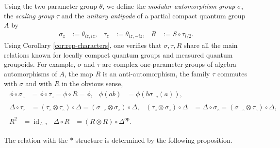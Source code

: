 \documentclass[11pt]{article}
\DeclareMathOperator{\id}{id}
\DeclareMathOperator{\op}{\mathrm{op}}
\theoremstyle{definition}
\numberwithin{equation}{section}
\begin{document}
Using the two-parameter group $\theta$, we define the \emph{modular
  automorphism group} $\sigma$, the \emph{scaling group} $\tau$   and
the \emph{unitary antipode} of a partial compact quantum group $A$ by
\begin{align} \label{eq:rep-groups}
  \sigma_{z} &:=\theta_{iz,iz}, & \tau_{z} &:=\theta_{iz,-iz}, & R&:=S
  \circ \tau_{i/2}.
\end{align}
Using Corollary \ref{cor:rep-characters}, one verifies that
$\sigma,\tau,R$ share all the main relations known for locally compact
quantum groups and measured quantum groupoids. For example, $\sigma$
and $\tau$ are complex one-parameter groups of algebra automorphisms
of $A$, the map $R$ is an anti-automorphism, the family  $\tau$ commutes with
$\sigma$ and with $R$ in the obvious sense, 
  \begin{gather}
    \begin{aligned} \label{eq:modular}
      \phi\circ \sigma_{z} &= \phi \circ \tau_{z} = \phi \circ R =
      \phi, & \phi(ab) &= \phi(b\sigma_{-i}(a)),
    \end{aligned}
\\ \label{eq:scaling-modular-delta}
    \begin{aligned} 
    \Delta \circ \tau_{z} &= (\tau_{z} \otimes \tau_{z}) \circ \Delta = (\sigma_{-z}\otimes \sigma_{z})\circ\Delta,
    & (\tau_{z} \otimes \sigma_{z}) \circ \Delta &= \Delta \circ
    \sigma_{z} = (\sigma_{-z} \otimes \tau_{z}) \circ \Delta,      
  \end{aligned} \\
  \begin{aligned} \label{eq:unitary-antipode}
    R^{2} &= \id_{A}, & \Delta \circ R &= (R \otimes R) \circ
    \Delta^{\op}.
  \end{aligned}
  \end{gather}

The relation with the $*$-structure is determined by the following proposition.
\end{document}
